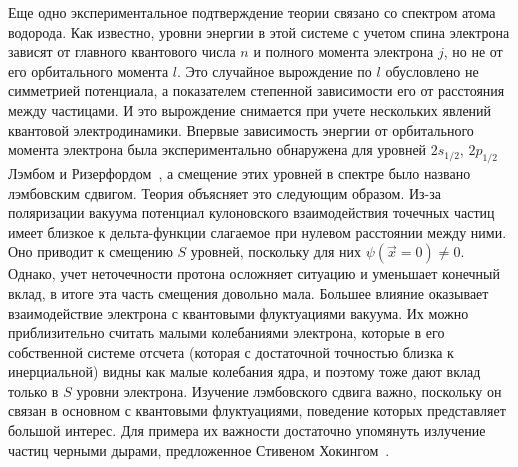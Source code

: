 Еще одно экспериментальное подтверждение теории связано со спектром атома водорода. 
Как известно, уровни энергии в этой системе с учетом спина электрона зависят от главного квантового числа $n$ и полного момента электрона $j$, но не от его орбитального момента $l$. 
Это случайное вырождение по $l$ обусловлено не симметрией потенциала, а показателем степенной зависимости его от расстояния между частицами. 
И это вырождение снимается при учете нескольких явлений квантовой электродинамики. 
Впервые зависимость энергии от орбитального момента электрона была экспериментально обнаружена для уровней $2s_{1/2}$, $2p_{1/2}$ Лэмбом и Ризерфордом~\cite{LambShift.exp}, а смещение этих уровней в спектре было названо лэмбовским сдвигом. 
%
Теория объясняет это следующим образом.
Из-за поляризации вакуума потенциал кулоновского взаимодействия точечных частиц имеет близкое к дельта-функции слагаемое при нулевом расстоянии между ними. 
Оно приводит к смещению $S$ уровней, поскольку для них $\psi(\vec{x}=0)\neq0$. 
Однако, учет неточечности протона осложняет ситуацию и уменьшает конечный вклад, в итоге эта часть смещения довольно мала. 
Большее влияние оказывает взаимодействие электрона с квантовыми флуктуациями вакуума. 
Их можно приблизительно считать малыми колебаниями электрона, которые в его собственной системе отсчета (которая с достаточной точностью близка к инерциальной) видны как малые колебания ядра, и поэтому тоже дают вклад только в $S$ уровни электрона. 
Изучение лэмбовского сдвига важно, поскольку он связан в основном с квантовыми флуктуациями, поведение которых представляет большой интерес. 
Для примера их важности достаточно упомянуть излучение частиц черными дырами, предложенное Стивеном Хокингом~\cite{Hawking}.

